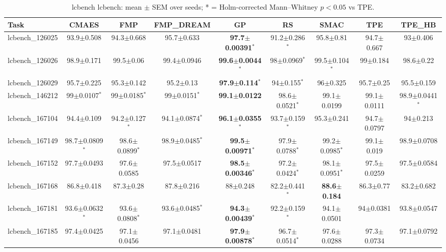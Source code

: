 \begin{table}[t]
\caption{lcbench lcbench: mean $\pm$ SEM over seeds; * = Holm-corrected Mann--Whitney $p<0.05$ vs TPE.}
\label{tab:lcbench_lcbench}
\begin{center}\small
\begin{tabular}{lcccccccc}
\hline
Task & CMAES & FMP & FMP\_DREAM & GP & RS & SMAC & TPE & TPE\_HB \\
\hline
lcbench\_126025 & 93.9$\pm$0.508 & 94.3$\pm$0.668 & 95.7$\pm$0.633 & \textbf{97.7$\pm$0.00391}$^{*}$ & 91.2$\pm$0.286$^{*}$ & 95.8$\pm$0.81 & 94.7$\pm$0.667 & 93$\pm$0.406 \\
lcbench\_126026 & 98.9$\pm$0.171 & 99.5$\pm$0.06 & 99.4$\pm$0.0946 & \textbf{99.6$\pm$0.0044}$^{*}$ & 98$\pm$0.0969$^{*}$ & 99.5$\pm$0.104$^{*}$ & 99$\pm$0.184 & 98.6$\pm$0.22 \\
lcbench\_126029 & 95.7$\pm$0.225 & 95.3$\pm$0.142 & 95.2$\pm$0.13 & \textbf{97.9$\pm$0.114}$^{*}$ & 94$\pm$0.155$^{*}$ & 96$\pm$0.325 & 95.7$\pm$0.25 & 95.5$\pm$0.159 \\
lcbench\_146212 & 99$\pm$0.0107$^{*}$ & 99$\pm$0.0185$^{*}$ & 99$\pm$0.0151$^{*}$ & \textbf{99.1$\pm$0.0122} & 98.6$\pm$0.0521$^{*}$ & 99.1$\pm$0.0199 & 99.1$\pm$0.0111 & 98.9$\pm$0.0441$^{*}$ \\
lcbench\_167104 & 94.4$\pm$0.109 & 94.2$\pm$0.127$^{*}$ & 94.1$\pm$0.0874$^{*}$ & \textbf{96.1$\pm$0.0355}$^{*}$ & 93.7$\pm$0.159$^{*}$ & 95.3$\pm$0.241 & 94.7$\pm$0.0797 & 94$\pm$0.213 \\
lcbench\_167149 & 98.7$\pm$0.0809$^{*}$ & 98.6$\pm$0.0899$^{*}$ & 98.9$\pm$0.0485$^{*}$ & \textbf{99.5$\pm$0.00971}$^{*}$ & 97.9$\pm$0.0788$^{*}$ & 99.2$\pm$0.0985$^{*}$ & 99.1$\pm$0.019 & 98.9$\pm$0.0708 \\
lcbench\_167152 & 97.7$\pm$0.0493 & 97.6$\pm$0.0585 & 97.5$\pm$0.0517 & \textbf{98.5$\pm$0.00346}$^{*}$ & 97.2$\pm$0.0424$^{*}$ & 98.1$\pm$0.0951$^{*}$ & 97.5$\pm$0.0259 & 97.5$\pm$0.0584 \\
lcbench\_167168 & 86.8$\pm$0.418 & 87.3$\pm$0.28 & 87.8$\pm$0.216 & 88$\pm$0.248 & 82.2$\pm$0.441$^{*}$ & \textbf{88.6$\pm$0.184} & 86.3$\pm$0.77 & 83.2$\pm$0.682 \\
lcbench\_167181 & 93.6$\pm$0.0632$^{*}$ & 93.6$\pm$0.0808$^{*}$ & 93.6$\pm$0.0485$^{*}$ & \textbf{94.3$\pm$0.00439}$^{*}$ & 92.2$\pm$0.159$^{*}$ & 94.1$\pm$0.0501 & 94$\pm$0.0381 & 93.8$\pm$0.0547 \\
lcbench\_167185 & 97.4$\pm$0.0425 & 97.1$\pm$0.0456 & 97.1$\pm$0.0481 & \textbf{97.9$\pm$0.00878}$^{*}$ & 96.7$\pm$0.0514$^{*}$ & 97.6$\pm$0.0288 & 97.3$\pm$0.0734 & 97.1$\pm$0.0792 \\

\end{tabular}
\end{center}
\end{table}
